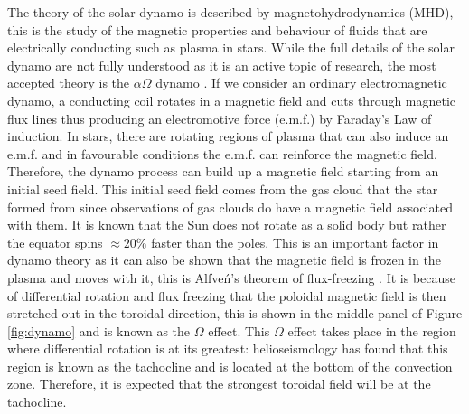 The theory of the solar dynamo is described by magnetohydrodynamics (MHD), this is the study of the magnetic properties and behaviour of fluids that are electrically conducting such as plasma in stars. While the full details of the solar dynamo are not fully understood as it is an active topic of research, the most accepted theory is the $\alpha\Omega$ dynamo \citep{Choudhuri_2007}. If we consider an ordinary electromagnetic dynamo, a conducting coil rotates in a magnetic field and cuts through magnetic flux lines thus producing an electromotive force (e.m.f.) by Faraday's Law of induction. In stars, there are rotating regions of plasma that can also induce an e.m.f. and in favourable conditions the e.m.f. can reinforce the magnetic field. Therefore, the dynamo process can build up a magnetic field starting from an initial seed field. This initial seed field comes from the gas cloud that the star formed from since observations of gas clouds do have a magnetic field associated with them. It is known that the Sun does not rotate as a solid body but rather the equator spins $\approx 20 \%$ faster than the poles. This is an important factor in dynamo theory as it can also be shown that the magnetic field is frozen in the plasma and moves with it, this is Alfve\'n's theorem of flux-freezing \citep{Alfven_1942}. It is because of differential rotation and flux freezing that the poloidal magnetic field is then stretched out in the toroidal direction, this is shown in the middle panel of Figure \ref{fig:dynamo} and is known as the $\Omega$ effect. This $\Omega$ effect takes place in the region where differential rotation is at its greatest: helioseismology has found that this region is known as the tachocline and is located at the bottom of the convection zone. Therefore, it is expected that the strongest toroidal field will be at the tachocline.


